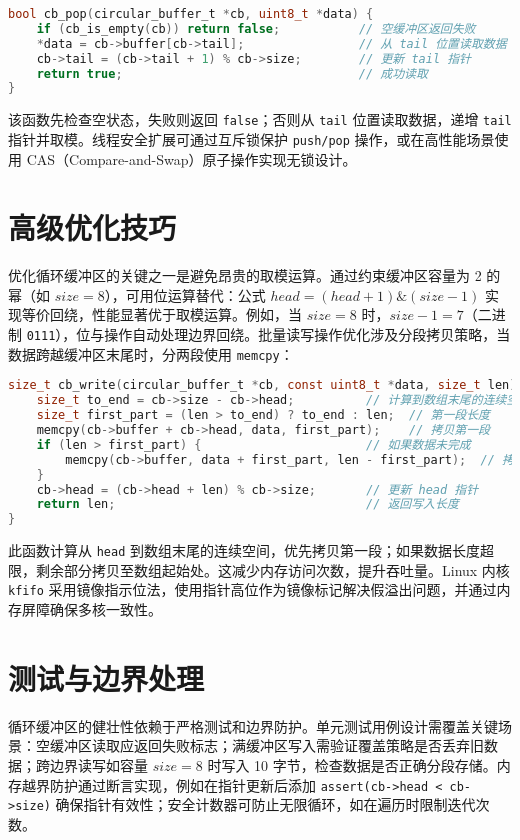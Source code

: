 \begin{lstlisting}[language=c]
bool cb_pop(circular_buffer_t *cb, uint8_t *data) {
    if (cb_is_empty(cb)) return false;           // 空缓冲区返回失败
    *data = cb->buffer[cb->tail];                // 从 tail 位置读取数据
    cb->tail = (cb->tail + 1) % cb->size;        // 更新 tail 指针
    return true;                                 // 成功读取
}
\end{lstlisting}
该函数先检查空状态，失败则返回 \texttt{false}；否则从 \texttt{tail} 位置读取数据，递增 \texttt{tail} 指针并取模。线程安全扩展可通过互斥锁保护 \texttt{push/pop} 操作，或在高性能场景使用 CAS（Compare-and-Swap）原子操作实现无锁设计。\par
\chapter{高级优化技巧}
优化循环缓冲区的关键之一是避免昂贵的取模运算。通过约束缓冲区容量为 2 的幂（如 $size = 8$），可用位运算替代：公式 $head = (head + 1) \& (size - 1)$ 实现等价回绕，性能显著优于取模运算。例如，当 $size = 8$ 时，$size - 1 = 7$（二进制 \texttt{0111}），位与操作自动处理边界回绕。批量读写操作优化涉及分段拷贝策略，当数据跨越缓冲区末尾时，分两段使用 \texttt{memcpy}：\par
\begin{lstlisting}[language=c]
size_t cb_write(circular_buffer_t *cb, const uint8_t *data, size_t len) {
    size_t to_end = cb->size - cb->head;          // 计算到数组末尾的连续空间
    size_t first_part = (len > to_end) ? to_end : len;  // 第一段长度
    memcpy(cb->buffer + cb->head, data, first_part);    // 拷贝第一段
    if (len > first_part) {                       // 如果数据未完成
        memcpy(cb->buffer, data + first_part, len - first_part);  // 拷贝剩余段至起始位置
    }
    cb->head = (cb->head + len) % cb->size;       // 更新 head 指针
    return len;                                   // 返回写入长度
}
\end{lstlisting}
此函数计算从 \texttt{head} 到数组末尾的连续空间，优先拷贝第一段；如果数据长度超限，剩余部分拷贝至数组起始处。这减少内存访问次数，提升吞吐量。Linux 内核 \texttt{kfifo} 采用镜像指示位法，使用指针高位作为镜像标记解决假溢出问题，并通过内存屏障确保多核一致性。\par
\chapter{测试与边界处理}
循环缓冲区的健壮性依赖于严格测试和边界防护。单元测试用例设计需覆盖关键场景：空缓冲区读取应返回失败标志；满缓冲区写入需验证覆盖策略是否丢弃旧数据；跨边界读写如容量 $size = 8$ 时写入 10 字节，检查数据是否正确分段存储。内存越界防护通过断言实现，例如在指针更新后添加 \texttt{assert(cb->head < cb->size)} 确保指针有效性；安全计数器可防止无限循环，如在遍历时限制迭代次数。\par
